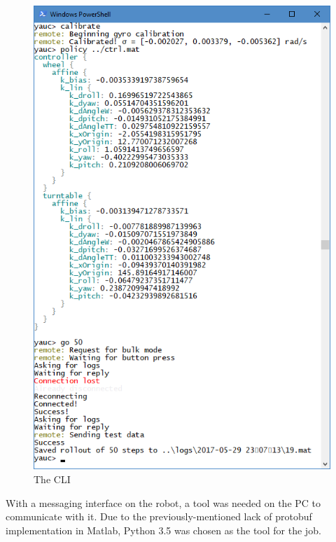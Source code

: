 \documentclass[main.tex]{subfiles}
\begin{document}
		\begin{figure}
			\includegraphics[width=\linewidth]{figures/cli.png}
			\caption{The CLI}
			\label{fig:cli}
		\end{figure}

		With a messaging interface on the robot, a tool was needed on the PC to communicate with it.
		Due to the previously-mentioned lack of protobuf implementation in Matlab, Python 3.5 was chosen as the tool for the job.
\end{document}
